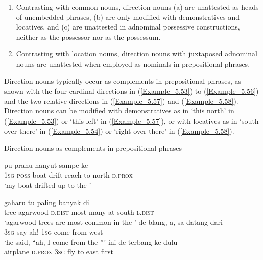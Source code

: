 \begin{enumerate}
\item 
Contrasting with common nouns, direction nouns (a) are unattested as heads of unembedded  phrases, (b) are only modified with demonstratives and locatives, and (c) are unattested in adnominal possessive constructions, neither as the possessor nor as the possessum.

\item  
Contrasting with location nouns, direction nouns with juxtaposed adnominal nouns are unattested when employed as nominals in prepositional phrases.
 
\end{enumerate}

Direction nouns typically occur as complements in prepositional phrases, as shown with the four cardinal directions in (\ref{Example_5.53}) to (\ref{Example_5.56}) and the two relative directions in (\ref{Example_5.57}) and (\ref{Example_5.58}). Direction nouns can be modified with demonstratives as in  ‘this north’ in (\ref{Example_5.53}) or  ‘this left’ in (\ref{Example_5.57}), or with locatives as in  ‘south over there’ in (\ref{Example_5.54}) or  ‘right over there’ in (\ref{Example_5.58}).


\begin{styleExampleTitle}
Direction nouns as complements in prepositional phrases
\end{styleExampleTitle}


\ea
\label{Example_5.53}
 {pu} {prahu} {hanyut} {sampe} {ke} {} {}\\ %
 \textsc{1sg}  \textsc{poss}  boat  drift  reach  to  north  \textsc{d.prox}\\
\glt 
‘my boat drifted up to the ’ \textstyleExampleSource{[Elicited BR130103.018]}
\z

\ea
\label{Example_5.54}
 {gaharu} {tu} {paling} {banyak} {di}  \\ %
 tree  agarwood  \textsc{d.dist}  most  many  at  south  \textsc{l.dist}\\
\glt 
‘agarwood trees are most common in the ’ \textstyleExampleSource{[Elicited BR130103.017]}
\z
\ea
\label{Example_5.55}
 {de}  {blang,}  {a},  sa  datang  dari  \\
 \textsc{3sg}  {say}  {ah!}  \textsc{1sg}  come  from  west\\
\glt 
‘he said, ``ah, I come from the ''' \textstyleExampleSource{[080922-010a-CvNF.0237]}
\z
\ea
\label{Example_5.56}
 {ini} {de} {terbang} {ke} {} {dulu}\\ %
 airplane  \textsc{d.prox}  \textsc{3sg}  fly  to  east  first\\


